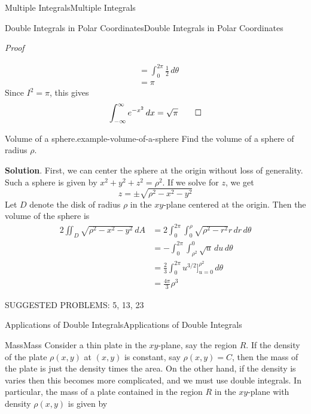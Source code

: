 \documentclass[10pt,]{book}
\makeatletter
\renewcommand*{\proofname}{Proof}
\renewenvironment{proof}[1][\proofname]{\par
  \pushQED{\qed}%
  \normalfont \topsep6\p@\@plus6\p@\relax
  \trivlist
  \item\relax
    {\itshape
    #1\@addpunct{.}}\hspace\labelsep\ignorespaces
}{%
  \popQED\endtrivlist\@endpefalse
}
\numberwithin{equation}{section}
\makeatother
\begin{document}
\begin{chapterptx}{Multiple Integrals}{}{Multiple Integrals}{}{}
\begin{sectionptx}{Double Integrals in Polar Coordinates}{}{Double Integrals in Polar Coordinates}{}{}
\begin{proof}
\begin{align*}
& = \int_{0}^{2\pi} \frac{1}{2}\,d\theta \\
& = \pi 
\end{align*}
Since \(I^{2} = \pi\), this gives%
\begin{equation*}
\int_{-\infty}^{\infty}e^{-x^{2}}\,dx = \sqrt{\pi}\qedhere
\end{equation*}
%
\end{proof}
\begin{example}{Volume of a sphere.}{example-volume-of-a-sphere}%
\hypertarget{p-1276}{}%
Find the volume of a sphere of radius \(\rho\).%
\par\smallskip%
\noindent\textbf{Solution}.\hypertarget{solution-203}{}\quad%
\hypertarget{p-1277}{}%
First, we can center the sphere at the origin without loss of generality. Such a sphere is given by \(x^{2} + y^{2} + z^{2} = \rho^{2}\). If we solve for \(z\), we get%
\begin{equation*}
z = \pm\sqrt{\rho^{2} - x^{2} - y^{2}}
\end{equation*}
Let \(D\) denote the disk of radius \(\rho\) in the \(xy\)-plane centered at the origin. Then the volume of the sphere is%
\begin{align*}
2\iint_{D}\sqrt{\rho^{2} - x^{2} - y^{2}}\,dA & = 2\int_{0}^{2\pi}\int_{0}^{\rho}\sqrt{\rho^{2} - r^{2}}r\,dr\,d\theta \\
& = -\int_{0}^{2\pi}\int_{\rho^{2}}^{0}\sqrt{u}\,du\,d\theta \\
& = \frac{2}{3}\int_{0}^{2\pi}u^{3/2}\bigg]_{u=0}^{\rho^{2}}\,d\theta \\
& = \frac{4\pi}{3}\rho^{3} 
\end{align*}
%
\end{example}
\hypertarget{p-1278}{}%
SUGGESTED PROBLEMS: 5, 13, 23%
\end{sectionptx}
%
%
\typeout{************************************************}
\typeout{************************************************}
%
\begin{sectionptx}{Applications of Double Integrals}{}{Applications of Double Integrals}{}{}\label{section-applications-of-double-integrals}
%
%
\typeout{************************************************}
\typeout{************************************************}
%
\begin{subsectionptx}{Mass}{}{Mass}{}{}\label{subsection-mass}
\hypertarget{p-1279}{}%
Consider a thin plate in the \(xy\)-plane, say the region \(R\). If the density of the plate \(\rho(x,y)\) at \((x,y)\) is constant, say \(\rho(x,y) = C\), then the mass of the plate is just the density times the area. On the other hand, if the density is varies then this becomes more complicated, and we must use double integrals. In particular, the mass of a plate contained in the region \(R\) in the \(xy\)-plane with density \(\rho(x,y)\) is given by%

\end{subsectionptx}
\end{sectionptx}
\end{chapterptx}
\end{document}
